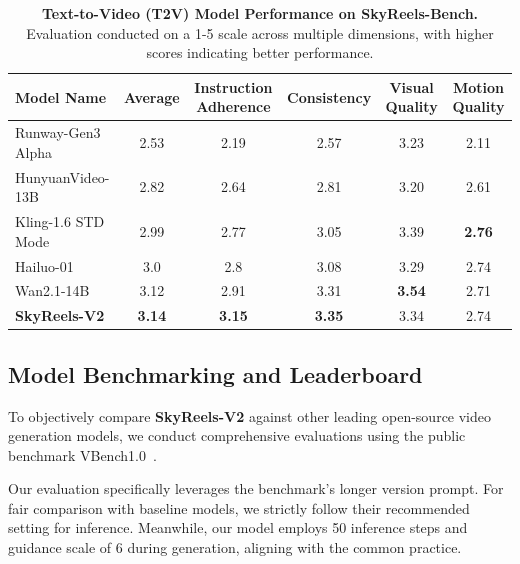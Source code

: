 \documentclass{article}
\begin{document}
{\begin{table}[htbp]
\centering
\setlength{\tabcolsep}{0pt}
\begin{tabular*}{\textwidth}{@{\extracolsep{\fill}}lccccc@{}}
\toprule
\textbf{Model Name} & \textbf{Average} & \textbf{Instruction Adherence} & \textbf{Consistency} & \textbf{Visual Quality} & \textbf{Motion Quality} \\
\midrule
Runway-Gen3 Alpha \cite{runwayml2025gen3alpha} & 2.53 & 2.19 & 2.57 & 3.23 & 2.11 \\
HunyuanVideo-13B \cite{kong2024hunyuanvideo} & 2.82 & 2.64 & 2.81 & 3.20 & 2.61 \\
Kling-1.6 STD Mode \cite{kuaishou2024kling} & 2.99 & 2.77 & 3.05 & 3.39 & \textbf{2.76} \\
Hailuo-01 \cite{minimax2024hailuo} & 3.0 & 2.8 & 3.08 & 3.29 & 2.74 \\
Wan2.1-14B \cite{wan2025} & 3.12 & 2.91 & 3.31 & \textbf{3.54} & 2.71 \\
\textbf{SkyReels-V2} & \textbf{3.14} & \textbf{3.15} & \textbf{3.35} & 3.34 & 2.74 \\
\bottomrule
\end{tabular*}
\vspace{4pt}
\caption{\textbf{Text-to-Video (T2V) Model Performance on SkyReels-Bench.} Evaluation conducted on a 1-5 scale across multiple dimensions, with higher scores indicating better performance.}
\label{tab:skyreels-bench-t2v}
\end{table}

\subsection{Model Benchmarking and Leaderboard}
To objectively compare \textbf{SkyReels-V2} against other leading open-source video generation models, we conduct comprehensive evaluations using the public benchmark VBench1.0~\cite{huang2023vbench}. 

Our evaluation specifically leverages the benchmark's longer version prompt. For fair comparison with baseline models, we strictly follow their recommended setting for inference. Meanwhile, our model employs 50 inference steps and guidance scale of 6 during generation, aligning with the common practice.


}
\end{document}
